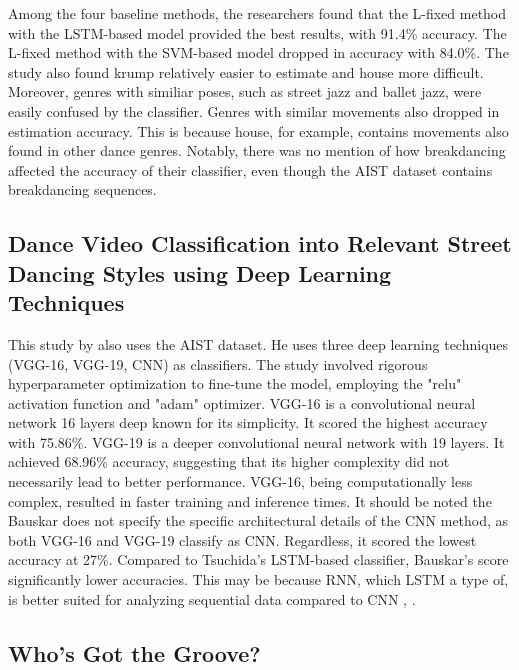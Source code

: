 \documentclass[12pt]{article}
\begin{document}
Among the four baseline methods, the researchers found that the L-fixed method with the LSTM-based model provided the best results, with  91.4\% accuracy. The L-fixed method with the SVM-based model dropped in accuracy with 84.0\%. The study also found krump relatively easier to estimate and house more difficult. Moreover, genres with similiar poses, such as street jazz and ballet jazz, were easily confused by the classifier. Genres with similar movements also dropped in estimation accuracy. This is because house, for example, contains movements also found in other dance genres. Notably, there was no mention of how breakdancing affected the accuracy of their classifier, even though the AIST dataset contains breakdancing sequences. 


\vspace{5mm}
\subsection{Dance Video Classification into Relevant Street Dancing Styles using Deep Learning Techniques}
\noindent
\par This study by \Textcite{bauskar2022dance} also uses the AIST dataset. He uses three deep learning techniques (VGG-16, VGG-19, CNN) as classifiers. The study involved rigorous hyperparameter optimization to fine-tune the model, employing the "relu" activation function and "adam" optimizer. VGG-16 is a convolutional neural network 16 layers deep known for its simplicity. It scored the highest accuracy with 75.86\%. VGG-19 is a deeper convolutional neural network with 19 layers. It achieved 68.96\% accuracy, suggesting that its higher complexity did not necessarily lead to better performance. VGG-16, being computationally less complex, resulted in faster training and inference times. It should be noted the Bauskar does not specify the specific architectural details of the CNN method, as both VGG-16 and VGG-19 classify as CNN. Regardless, it scored the lowest accuracy at 27\%. Compared to Tsuchida's LSTM-based classifier, Bauskar's score significantly lower accuracies. This may be because RNN, which LSTM a type of, is better suited for analyzing sequential data compared to CNN \parencite{Gupta_2023}, \parencite{Craig_2023}.


\vspace{5mm}    
\subsection{Who’s Got the Groove?}
\noindent
\par 
\end{document}
